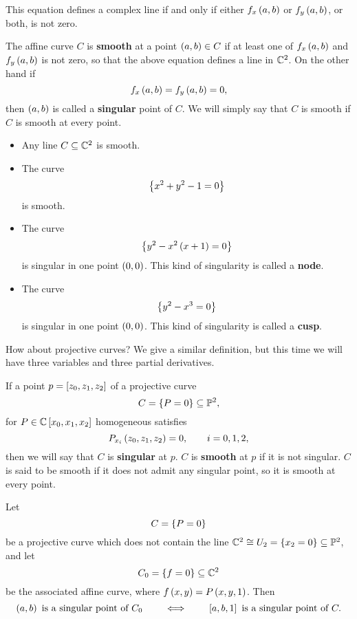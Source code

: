 \begin{note*}
This equation defines a complex line if and only if either $ f_x\rb{a, b} $ or $ f_y\rb{a, b} $, or both, is not zero.
\end{note*}

\begin{definition}
The affine curve $ C $ is \textbf{smooth} at a point $ \rb{a, b} \in C $ if at least one of $ f_x\rb{a, b} $ and $ f_y\rb{a, b} $ is not zero, so that the above equation defines a line in $ \C^2 $. On the other hand if
$$ f_x\rb{a, b} = f_y\rb{a, b} = 0, $$
then $ \rb{a, b} $ is called a \textbf{singular} point of $ C $. We will simply say that $ C $ is smooth if $ C $ is smooth at every point.
\end{definition}

\begin{example}
\hfill
\begin{itemize}
\item Any line $ C \subseteq \C^2 $ is smooth.
\item The curve
$$ \cb{x^2 + y^2 - 1 = 0} $$
is smooth.
\item The curve
$$ \cb{y^2 - x^2\rb{x + 1} = 0} $$
is singular in one point $ \rb{0, 0} $. This kind of singularity is called a \textbf{node}.
\item The curve
$$ \cb{y^2 - x^3 = 0} $$
is singular in one point $ \rb{0, 0} $. This kind of singularity is called a \textbf{cusp}.
\end{itemize}
\end{example}

How about projective curves? We give a similar definition, but this time we will have three variables and three partial derivatives.

\begin{definition}
If a point $ p = \sb{z_0, z_1, z_2} $ of a projective curve
$$ C = \cb{P = 0} \subseteq \P^2, $$
for $ P \in \C\sb{x_0, x_1, x_2} $ homogeneous satisfies
$$ P_{x_i}\rb{z_0, z_1, z_2} = 0, \qquad i = 0, 1, 2, $$
then we will say that $ C $ is \textbf{singular} at $ p $. $ C $ is \textbf{smooth} at $ p $ if it is not singular. $ C $ is said to be smooth if it does not admit any singular point, so it is smooth at every point.
\end{definition}

\begin{lemma}
\label{lem:7.5}
Let
$$ C = \cb{P = 0} $$
be a projective curve which does not contain the line $ \C^2 \cong U_2 = \cb{x_2 = 0} \subseteq \P^2 $, and let
$$ C_0 = \cb{f = 0} \subseteq \C^2 $$
be the associated affine curve, where $ f\rb{x, y} = P\rb{x, y, 1} $. Then
$$ \rb{a, b} \ \text{is a singular point of} \ C_0 \qquad \iff \qquad \sb{a, b, 1} \ \text{is a singular point of} \ C. $$
\end{lemma}

